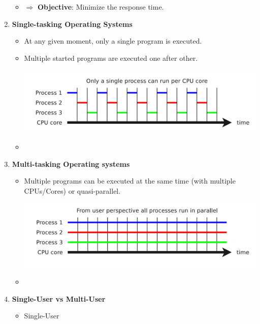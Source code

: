 \documentclass{article}
\begin{document}
\begin{enumerate}
\begin{itemize}
            \item $\Rightarrow$ \textbf{Objective}: Minimize the response time.
            
        \end{itemize}
        
        \item \textbf{Single-tasking Operating Systems}
        \begin{itemize}
            \item At any given moment, only a single program is executed.
            
            \item Multiple started programs are executed one after other.
            
            \includegraphics[width=.78\textwidth]{img/singletasking_CPU_time.png}
            
            \item 
            
        \end{itemize}
    
    
    	\item \textbf{Multi-tasking Operating systems}
    	\begin{itemize}
    		\item Multiple programs can be executed at the same time (with multiple CPUs/Cores) or quasi-parallel.
    		
    		\includegraphics[width=.78\textwidth]{img/multitasking_CPU_time.png}
    		
    		\item
    	\end{itemize}
    
    
    	\item \textbf{Single-User vs Multi-User}
    	\begin{itemize}
    		\item Single-User 
    	\end{itemize}
        
        
    \end{enumerate}
\end{document}
